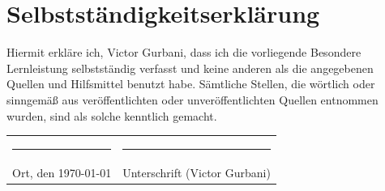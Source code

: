 \section*{Selbstständigkeitserklärung}

Hiermit erkläre ich, Victor Gurbani, dass ich die vorliegende Besondere Lernleistung selbstständig verfasst und keine anderen als die angegebenen Quellen und Hilfsmittel benutzt habe. Sämtliche Stellen, die wörtlich oder sinngemäß aus veröffentlichten oder unveröffentlichten Quellen entnommen wurden, sind als solche kenntlich gemacht.

\vspace{2.0cm}
\begin{tabular}{p{6.0cm}p{6.0cm}}
\rule{6.0cm}{0.4pt} & \rule{6.0cm}{0.4pt} \\
Ort, den \today & Unterschrift (Victor Gurbani) \\
\end{tabular}

